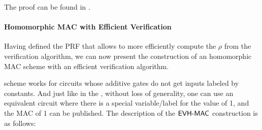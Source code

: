 The proof can be found in \cite{backes:fiore:reischuk:2013}.

\paragraph*{Homomorphic MAC with Efficient Verification} Having defined the PRF
that allows to more efficiently compute the $\rho$ from the verification
algorithm, we can now present the construction of an homomorphic MAC scheme
with an efficient verification algorithm.

 scheme works for circuits whose
additive gates do not get inputs labeled by constants. And just like in the
, without loss of generality, one can use an
equivalent circuit where there is a special variable/label for the value of 1,
and the MAC of 1 can be published.  The description of the $\operatorname{\mathsf{EVH}-\mathsf{MAC}}$
construction is as follows:
